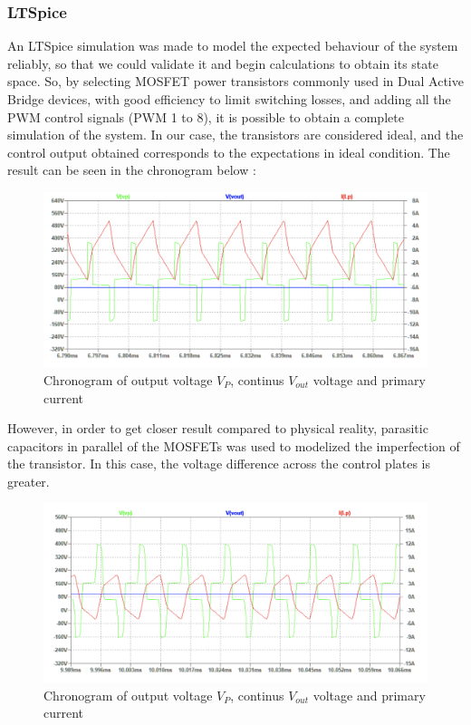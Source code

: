 \documentclass[conference]{IEEEtran}
\begin{document}
\subsubsection{LTSpice}
An LTSpice simulation was made to model the expected behaviour of the system reliably,
so that we could validate it and begin calculations to obtain its state space.
So, by selecting MOSFET power transistors commonly used in Dual Active Bridge
devices, with good efficiency to limit switching losses, and adding all the PWM control
signals (PWM 1 to 8), it is possible to obtain a complete simulation of the system. In our
case, the transistors are considered ideal, and the control output obtained corresponds
to the expectations in ideal condition. The result can be seen in the chronogram below :
\begin{figure}[htbp]
	\centerline{\includegraphics[width=\linewidth]{images/8.png}}
	\caption{Chronogram of output voltage \(V_P\), continus \(V_{out}\) voltage and primary current}
	\label{fig}
\end{figure}
However, in order to get closer result compared to physical reality, parasitic capacitors
in parallel of the MOSFETs was used to modelized the imperfection of the transistor. In
this case, the voltage difference across the control plates is greater.
\begin{figure}[htbp]
	\centerline{\includegraphics[width=\linewidth]{images/9.png}}
	\caption{Chronogram of output voltage \(V_P\), continus \(V_{out}\) voltage and primary current}
	\label{fig}
\end{figure}
\end{document}
